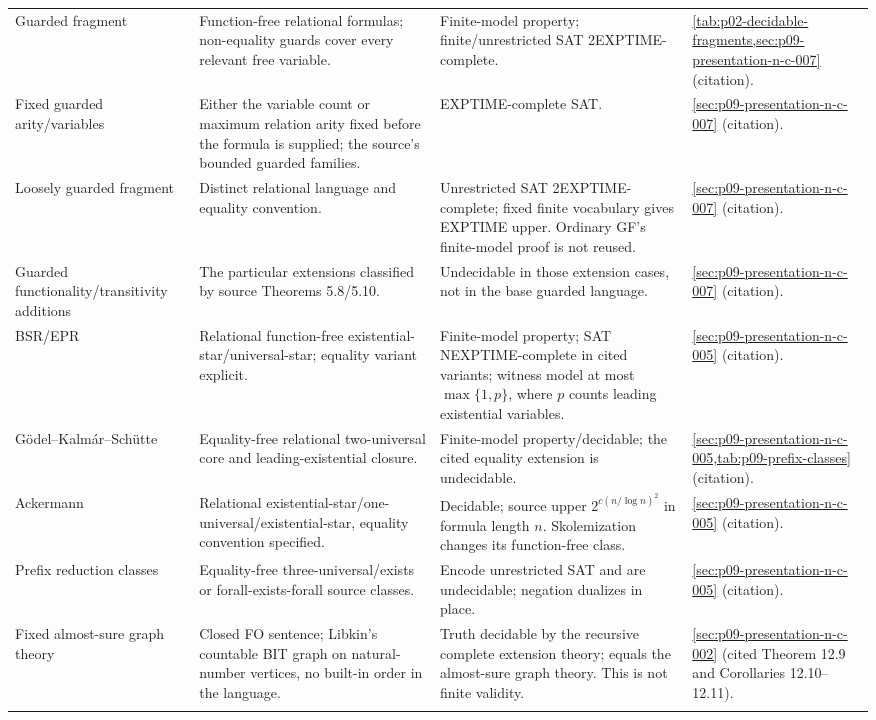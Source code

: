 \begin{landscape}
\begin{longtable}{@{}p{.18\linewidth}p{.25\linewidth}p{.23\linewidth}p{.26\linewidth}@{}}
Guarded fragment & Function-free relational formulas; non-equality guards cover every relevant free variable. & Finite-model property; finite/unrestricted SAT 2EXPTIME-complete. & \cref{tab:p02-decidable-fragments,sec:p09-presentation-n-c-007} (citation).\\\addlinespace
Fixed guarded arity/variables & Either the variable count or maximum relation arity fixed before the formula is supplied; the source's bounded guarded families. & EXPTIME-complete SAT. & \cref{sec:p09-presentation-n-c-007} (citation).\\\addlinespace
Loosely guarded fragment & Distinct relational language and equality convention. & Unrestricted SAT 2EXPTIME-complete; fixed finite vocabulary gives EXPTIME upper. Ordinary GF's finite-model proof is not reused. & \cref{sec:p09-presentation-n-c-007} (citation).\\\addlinespace
Guarded functionality/transitivity additions & The particular extensions classified by source Theorems 5.8/5.10. & Undecidable in those extension cases, not in the base guarded language. & \cref{sec:p09-presentation-n-c-007} (citation).\\\addlinespace
BSR/EPR & Relational function-free existential-star/universal-star; equality variant explicit. & Finite-model property; SAT NEXPTIME-complete in cited variants; witness model at most \(\max\{1,p\}\), where \(p\) counts leading existential variables. & \cref{sec:p09-presentation-n-c-005} (citation).\\\addlinespace
G\"odel--Kalm\'ar--Sch\"utte & Equality-free relational two-universal core and leading-existential closure. & Finite-model property/decidable; the cited equality extension is undecidable. & \cref{sec:p09-presentation-n-c-005,tab:p09-prefix-classes} (citation).\\\addlinespace
Ackermann & Relational existential-star/one-universal/existential-star, equality convention specified. & Decidable; source upper \(2^{c(n/\log n)^2}\) in formula length \(n\). Skolemization changes its function-free class. & \cref{sec:p09-presentation-n-c-005} (citation).\\\addlinespace
Prefix reduction classes & Equality-free three-universal/exists or forall-exists-forall source classes. & Encode unrestricted SAT and are undecidable; negation dualizes in place. & \cref{sec:p09-presentation-n-c-005} (citation).\\\addlinespace
Fixed almost-sure graph theory & Closed FO sentence; Libkin's countable BIT graph on natural-number vertices, no built-in order in the language. & Truth decidable by the recursive complete extension theory; equals the almost-sure graph theory. This is not finite validity. & \cref{sec:p09-presentation-n-c-002} (cited Theorem 12.9 and Corollaries 12.10--12.11).\\\addlinespace

\end{longtable}
\end{landscape}
